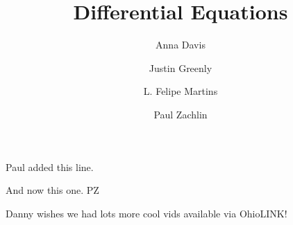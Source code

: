 \documentclass{article}
\author{Anna Davis \and Justin Greenly \and L. Felipe Martins \and Paul Zachlin}
\title{Differential Equations}
\begin{document}
\maketitle

Paul added this line.

And now this one.  PZ

Danny wishes we had lots more cool vids available via OhioLINK!
\end{document}
